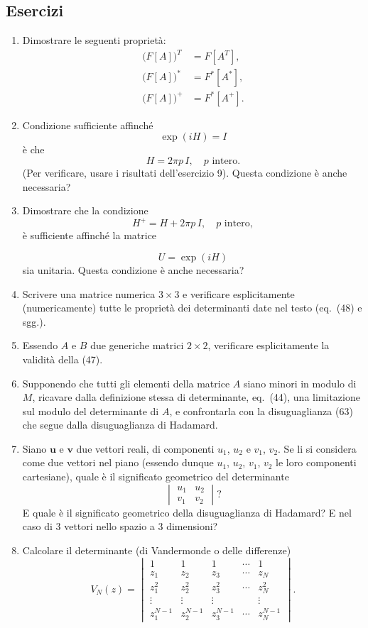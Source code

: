 \documentclass[11pt, a4paper]{book}
\numberwithin{equation}{section}
\newenvironment{esercizi}{\subsection*{Esercizi}\begin{enumerate}}{\end{enumerate}}
\begin{document}
\begin{esercizi}
\item Dimostrare le seguenti proprietà:
\begin{align*}
\bigl(F[A]\bigr)^T &= F[A^T], \\
\bigl(F[A]\bigr)^* &= F^*[A^*], \\
\bigl(F[A]\bigr)^+ &= F^*[A^+].
\end{align*}

\item Condizione sufficiente affinché
\[
\exp(i H) = I
\]
è che
\[
H = 2\pi p\, I, \quad p \text{ intero}.
\]
(Per verificare, usare i risultati dell'esercizio 9).
Questa condizione è anche necessaria?

\item Dimostrare che la condizione
\[
H^+ = H + 2\pi p\, I, \quad p \text{ intero},
\]
è sufficiente affinché la matrice


\[
U = \exp(i H)
\]
sia unitaria. Questa condizione è anche necessaria?

\item Scrivere una matrice numerica $3\times 3$ e verificare esplicitamente
(numericamente) tutte le proprietà dei determinanti date nel testo (eq.\ (48)
e sgg.).

\item Essendo $A$ e $B$ due generiche matrici $2\times 2$, verificare
esplicitamente la validità della (47).

\item Supponendo che tutti gli elementi della matrice $A$ siano minori in
modulo di $M$, ricavare dalla definizione stessa di determinante, eq.\ (44),
una limitazione sul modulo del determinante di $A$, e confrontarla con la
disuguaglianza (63) che segue dalla disuguaglianza di Hadamard.

\item Siano $\mathbf{u}$ e $\mathbf{v}$ due vettori reali, di componenti
$u_1$, $u_2$ e $v_1$, $v_2$. Se li si considera come due vettori nel piano
(essendo dunque $u_1$, $u_2$, $v_1$, $v_2$ le loro componenti cartesiane),
quale è il significato geometrico del determinante
\[
\begin{vmatrix} u_1 & u_2 \\ v_1 & v_2 \end{vmatrix}?
\]
E quale è il significato geometrico della disuguaglianza di Hadamard? E nel
caso di 3 vettori nello spazio a 3 dimensioni?

\item[*] Calcolare il determinante (di Vandermonde o delle differenze)
\[
V_N(z) =
\begin{vmatrix}
1      & 1      & 1      & \cdots & 1      \\
z_1    & z_2    & z_3    & \cdots & z_N    \\
z_1^2  & z_2^2  & z_3^2  & \cdots & z_N^2  \\
\vdots & \vdots & \vdots &        & \vdots \\
z_1^{N-1} & z_2^{N-1} & z_3^{N-1} & \cdots & z_N^{N-1}
\end{vmatrix}.
\]


\end{esercizi}
\end{document}
